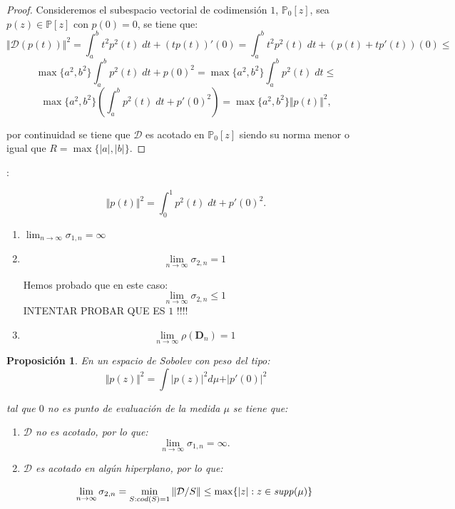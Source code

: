 \documentclass[11pt]{article}
\newtheorem{prop1}{Proposici\'{o}n}%
\newenvironment{prop}{\begin{prop1}\rm}{\end{prop1}}
\begin{document}
\begin{proof} Consideremos el subespacio vectorial de codimensión $1$, $\mathbb{P}_{0}[z]$, sea $p(z)\in \mathbb{P}[z]$ con $p(0)=0$, se tiene que:
  $$
    \Vert \mathcal{D}(p(t))\Vert^{2} = \int_{a}^{b} t^{2}p^{2}(t)\; dt + (tp(t))'(0)=  \int_{a}^{b} t^{2}p^{2}(t)\; dt + (p(t)+tp'(t))(0)\leq
  $$
  $$
    \max \{a^2,b^2\} \int_{a}^{b} p^{2}(t)\; dt + p(0)^2= \max \{a^2,b^2\} \int_{a}^{b} p^{2}(t)\; dt \leq
  $$
  $$
    \max \{a^2,b^2\} ( \int_{a}^{b} p^{2}(t)\; dt+p'(0)^2)=\max \{a^2,b^2\} \Vert p(t)\Vert^{2},
  $$

  \noindent por continuidad se tiene que $\mathcal{D}$ es acotado en $\mathbb{P}_0[z]$ siendo su norma menor o igual que $R=\max\{\vert a \vert, \vert b \vert \}$.
\end{proof}


:

$$
  \Vert p(t) \Vert^{2} = \int_{0}^{1} p^{2}(t)\; dt + p'(0)^{2}.
$$


\begin{enumerate}
  \item $\lim_{n \to \infty} \sigma_{1,n}=\infty$
  \item $$\lim_{n\to \infty} \sigma_{2,n}=1$$

        \noindent Hemos probado que en este caso:
        $$
          \lim_{n\to \infty} \sigma_{2,n} \leq 1
        $$
        \noindent INTENTAR PROBAR QUE ES $1$ !!!!

  \item
        $$
          \lim_{n\to \infty} \rho(\mathbf{D}_n)=1
        $$
\end{enumerate}


\begin{prop} En un espacio de Sobolev con peso del tipo:
  $$
    \Vert p(z) \Vert^{2} = \int \vert p(z) \vert^{2} d\mu +  \vert p'(0) \vert^{2}
  $$

  \noindent tal que $0$ no es punto de evaluación de la medida $\mu$  se tiene que:

  \begin{enumerate}
    \item $\mathcal{D}$ no es acotado, por lo que:
          $$
            \lim_{n\to\infty} \sigma_{1,n}= \infty.
          $$
    \item $\mathcal{D}$ es acotado en algún hiperplano, por lo que:

          $$
            \lim_{n\to \infty} \sigma_{2,n}= \min_{S: cod(S)=1} \Vert \mathcal{D}/S \Vert \leq \max\{\vert z \vert : z\in {\it supp}(\mu) \}
          $$
  \end{enumerate}

\end{prop}
\end{document}

